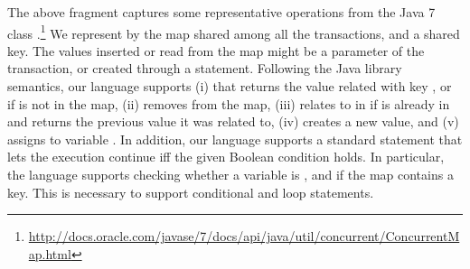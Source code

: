 The above fragment captures some representative operations from the Java 7 class .\footnote{\url{http://docs.oracle.com/javase/7/docs/api/java/util/concurrent/ConcurrentMap.html}} We represent by  the map shared among all the transactions, and  a shared key. The values inserted or read from the map might be a parameter of the transaction, or created through a  statement. Following the Java library semantics, our language supports (i)  that returns the value  related with key , or  if  is not in the map, (ii)  removes  from the map, (iii)  relates  to  in  if  is already in  and returns the previous value it was related to, (iv)  creates a new value, and (v)  assigns  to variable . In addition, our language supports a standard  statement that lets the execution continue iff the given Boolean condition holds. In particular, the language supports checking whether a variable is , and if the map contains a key. This is necessary to support conditional and loop statements.


%
%	
%
%
%


